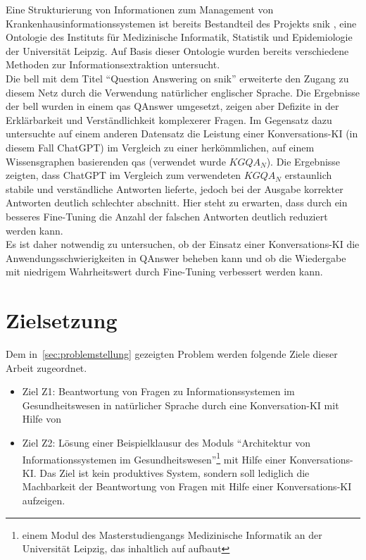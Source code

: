 Eine Strukturierung von Informationen zum Management von Krankenhausinformationssystemen ist bereits Bestandteil des Projekts \ac{snik} \citep{semantischesnetz, domaene},
eine Ontologie des Instituts für Medizinische Informatik, Statistik und Epidemiologie der Universität Leipzig.
Auf Basis dieser Ontologie wurden bereits verschiedene Methoden zur Informationsextraktion untersucht.\\
Die \ac{bell} mit dem Titel \enquote{Question Answering on \ac{snik}} \citep{hannesbell} erweiterte den Zugang zu diesem Netz durch die Verwendung natürlicher englischer Sprache.
Die Ergebnisse der \ac{bell} wurden in einem \ac{qas} QAnswer \citep{qanswer} umgesetzt, zeigen aber Defizite in der Erklärbarkeit und Verständlichkeit komplexerer Fragen.
Im Gegensatz dazu untersuchte \citet{chatgpt_qas} auf einem anderen Datensatz die Leistung einer Konversations-KI (in diesem Fall ChatGPT) im Vergleich zu einer herkömmlichen, auf einem Wissensgraphen basierenden \ac{qas} (verwendet wurde $KGQA_N$).
Die Ergebnisse zeigten, dass ChatGPT im Vergleich zum verwendeten $KGQA_N$ erstaunlich stabile und verständliche Antworten lieferte, jedoch bei der Ausgabe korrekter Antworten deutlich schlechter abschnitt. Hier steht zu erwarten, dass durch ein besseres Fine-Tuning die Anzahl der falschen Antworten deutlich reduziert werden kann.\\

Es ist daher notwendig zu untersuchen, ob der Einsatz einer Konversations-KI die Anwendungsschwierigkeiten in QAnswer beheben kann und ob die Wiedergabe mit niedrigem Wahrheitswert durch Fine-Tuning verbessert werden kann.

\section{Zielsetzung}\label{sec:zielsetzung}

Dem in~\ref{sec:problemstellung} gezeigten Problem werden folgende Ziele dieser Arbeit zugeordnet.
\begin{itemize}
  \item Ziel Z1: Beantwortung von Fragen zu Informationssystemen im Gesundheitswesen in natürlicher Sprache durch eine Konversation-KI mit Hilfe von \citet{bb}
  \item Ziel Z2: Lösung einer Beispielklausur des Moduls \enquote{Architektur von Informationssystemen im Gesundheitswesen}\footnote{\raggedright{}einem Modul des Masterstudiengangs Medizinische Informatik an der Universität Leipzig, das inhaltlich auf \citet{bb} aufbaut} mit Hilfe einer Konversations-KI.\@
  Das Ziel ist kein produktives System, sondern soll lediglich die Machbarkeit der Beantwortung von Fragen mit Hilfe einer Konversations-KI aufzeigen.
\end{itemize}

